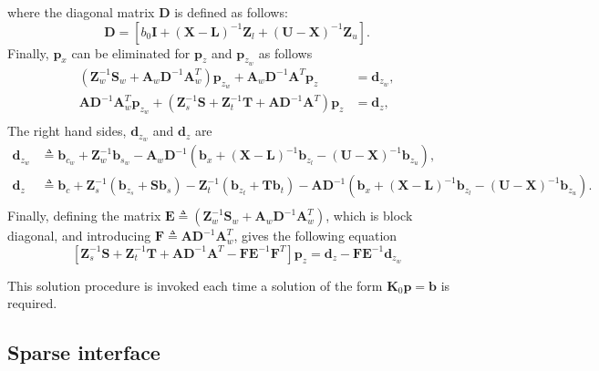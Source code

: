 \documentclass[12pt]{article}
\newcommand{\mb}{\mathbf}
\begin{document}
where the diagonal matrix $\mb{D}$ is defined as follows:
\begin{equation*}
  \mb{D} = \left[ b_{0} \mb{I} + (\mb{X} - \mb{L})^{-1}\mb{Z}_{l} + (\mb{U} - \mb{X})^{-1}\mb{Z}_{u} \right].
\end{equation*}
%
Finally, $\mb{p}_{x}$ can be eliminated for $\mb{p}_{z}$ and $\mb{p}_{z_{w}}$ as follows
\begin{equation}
  \begin{aligned}
    (\mb{Z}_{w}^{-1}\mb{S}_{w} + \mb{A}_{w}\mb{D}^{-1}\mb{A}_{w}^{T})\mb{p}_{z_{w}} + \mb{A}_{w}\mb{D}^{-1}\mb{A}^{T}\mb{p}_{z} &= \mb{d}_{z_{w}}, \\
    \mb{A}\mb{D}^{-1}\mb{A}_{w}^{T} \mb{p}_{z_{w}} + (\mb{Z}_{s}^{-1}\mb{S} + \mb{Z}_{t}^{-1}\mb{T} + \mb{A}\mb{D}^{-1}\mb{A}^{T})\mb{p}_{z} &= \mb{d}_{z}, \\
  \end{aligned}
\end{equation}
%
The right hand sides, $\mb{d}_{z_{w}}$ and $\mb{d}_{z}$ are
\begin{equation*}
  \begin{aligned}
    \mb{d}_{z_{w}} &\triangleq \mb{b}_{c_{w}} + \mb{Z}_{w}^{-1}\mb{b}_{s_{w}} - \mb{A}_{w}\mb{D}^{-1}\left(\mb{b}_{x} + (\mb{X} - \mb{L})^{-1}\mb{b}_{z_{l}} - (\mb{U} - \mb{X})^{-1}\mb{b}_{z_{u}} \right), \\
    \mb{d}_{z} &\triangleq \mb{b}_{c} + \mb{Z}_{s}^{-1}(\mb{b}_{z_{s}} + \mb{S}\mb{b}_{s}) - \mb{Z}_{t}^{-1}(\mb{b}_{z_{t}} + \mb{T}\mb{b}_{t}) - \mb{A}\mb{D}^{-1}\left(\mb{b}_{x} + (\mb{X} - \mb{L})^{-1}\mb{b}_{z_{l}} - (\mb{U} - \mb{X})^{-1}\mb{b}_{z_{u}} \right). \\
  \end{aligned}
\end{equation*}
%
Finally, defining the matrix $\mb{E} \triangleq (\mb{Z}_{w}^{-1}\mb{S}_{w} + \mb{A}_{w}\mb{D}^{-1}\mb{A}_{w}^{T})$, which is block diagonal, and introducing $\mb{F} \triangleq \mb{A}\mb{D}^{-1}\mb{A}_{w}^{T}$, gives the following equation
\begin{equation*}
  \left[\mb{Z}_{s}^{-1}\mb{S} + \mb{Z}_{t}^{-1}\mb{T} + \mb{A}\mb{D}^{-1}\mb{A}^{T} - \mb{F}\mb{E}^{-1}\mb{F}^{T} \right]\mb{p}_{z} = \mb{d}_{z} - \mb{F}\mb{E}^{-1} \mb{d}_{z_{w}}
\end{equation*}

This solution procedure is invoked each time a solution of the form $\mb{K}_{0}\mb{p} = \mb{b}$ is required.

\subsection{Sparse interface}
\end{document}
